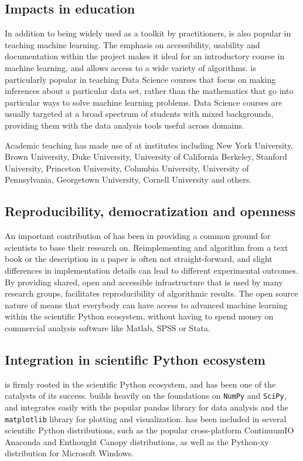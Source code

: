 \subsection{Impacts in education}
In addition to being widely used as a toolkit by practitioners,
\sklearn{} is also popular in teaching machine learning.
The emphasis on accessibility, usability and documentation within
the \sklearn{} project makes it ideal for an introductory
course in machine learning, and allows access to a wide variety
of algorithms. \sklearn{} is particularly popular in teaching
Data Science courses that focus on making inferences about
a particular data set, rather than the mathematics that go into
particular ways to solve machine learning problems.
Data Science courses are usually targeted at a broad spectrum
of students with mixed backgrounds, providing them
with the data analysis tools useful across domains.

Academic teaching has made use of \sklearn{} at institutes including New York
University, Brown University, Duke University, University of California
Berkeley, Stanford University, Princeton University, Columbia University,
University of Pennsylvania, Georgetown University, Cornell University and
others.

\subsection{Reproducibility, democratization and openness}
An important contribution of \sklearn{} has been in providing a common
ground for scientists to base their research on. Reimplementing
and algorithm from a text book or the description in a paper is often not
straight-forward, and slight differences in implementation details can
lead to different experimental outcomes. By providing shared, open and 
accessible infrastructure that is used by many research groups,
\sklearn{} facilitates reproducibility of algorithmic results.
The open source nature of \sklearn{} means that everybody can have access
to advanced machine learning within the scientific Python ecosystem,
without having to spend money on commercial analysis software like Matlab,
SPSS or Stata.

\subsection{Integration in scientific Python ecosystem}
\sklearn{} is firmly rooted in the scientific Python ecosystem, and has been
one of the catalysts of its success. \sklearn{} builds heavily on the
foundations on \texttt{NumPy} and \texttt{SciPy}, and integrates easily with the popular pandas
library for data analysis and the \texttt{matplotlib} library for plotting and
visualization.
\sklearn{} has been included in several scientific Python distributions, such
as the popular cross-platform ContinuumIO Anaconda and Enthought Canopy
distributions, as well as the Python-xy distribution for Microsoft Windows.

